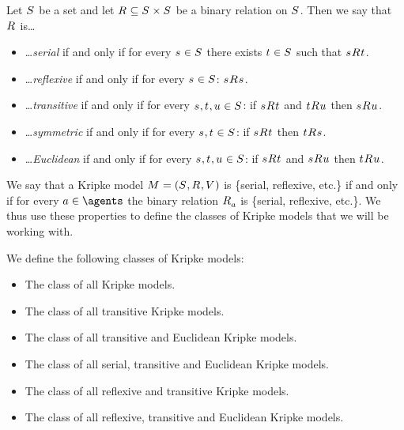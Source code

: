 \begin{definition}
Let $\states$ be a set and let $\accessibilityRel \subseteq \states \times \states$ be a binary relation on $\states$. 
Then we say that $\accessibilityRel$ is\ldots
\begin{itemize}
    \item \ldots {\em serial} if and only if for every $\stateS \in \states$ there exists $\stateT \in \states$ such that $\stateS \accessibility{} \stateT$.
    \item \ldots {\em reflexive} if and only if for every $\stateS \in \states$: $\stateS \accessibility{} \stateS$.
    \item \ldots {\em transitive} if and only if for every $\stateS, \stateT, \stateU \in \states$: if $\stateS \accessibility{} \stateT$ and $\stateT \accessibility{} \stateU$ then $\stateS \accessibility{} \stateU$.
    \item \ldots {\em symmetric} if and only if for every $\stateS, \stateT \in \states$: if $\stateS \accessibility{} \stateT$ then $\stateT \accessibility{} \stateS$.
    \item \ldots {\em Euclidean} if and only if for every $\stateS, \stateT, \stateU \in \states$: if $\stateS \accessibility{} \stateT$ and $\stateS \accessibility{} \stateU$ then $\stateT \accessibility{} \stateU$.
\end{itemize}
\end{definition}

We say that a Kripke model $\modelAndTuple$ is \{serial, reflexive, etc.\} if and only if for every $\agentA \in \agents$ the binary relation $\accessibility{\agentA}$ is \{serial, reflexive, etc.\}.
We thus use these properties to define the classes of Kripke models that we will be working with.

\begin{definition}
We define the following classes of Kripke models:
\begin{itemize}
    \item The class \classK{} of all Kripke models.
    \item The class \classKF{} of all transitive Kripke models.
    \item The class \classKFF{} of all transitive and Euclidean Kripke models.
    \item The class \classKD{} of all serial, transitive and Euclidean Kripke models.
    \item The class \classSF{} of all reflexive and transitive Kripke models.
    \item The class \classS{} of all reflexive, transitive and Euclidean Kripke models.
\end{itemize}
\end{definition}

